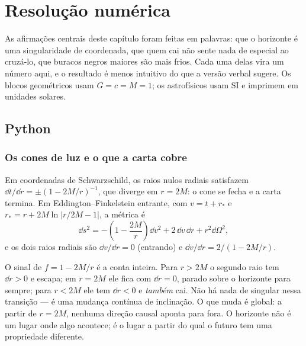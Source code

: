 \section{Resolução numérica}
\label{sec:cap11-numerica}

As afirmações centrais deste capítulo foram feitas em palavras: que o
horizonte é uma singularidade de coordenada, que quem cai não sente nada de
especial ao cruzá-lo, que buracos negros maiores são mais frios. Cada uma
delas vira um número aqui, e o resultado é menos intuitivo do que a versão
verbal sugere. Os blocos geométricos usam $G=c=M=1$; os astrofísicos usam SI
e imprimem em unidades solares.

\subsection{Python}


\subsubsection*{Os cones de luz e o que a carta cobre}

Em coordenadas de Schwarzschild, os raios nulos radiais satisfazem
$\dd t/\dd r = \pm(1-2M/r)^{-1}$, que diverge em $r=2M$: o cone se fecha e a
carta termina. Em Eddington--Finkelstein entrante, com $v = t+r_{*}$ e
$r_{*} = r + 2M\ln|r/2M - 1|$, a métrica é
\begin{equation}
  \dd s^{2} = -\left(1-\frac{2M}{r}\right)\dd v^{2}
              + 2\,\dd v\,\dd r + r^{2}\dd\Omega^{2},
  \label{eq:cap12-ef}
\end{equation}
e os dois raios radiais são $\dd v/\dd r = 0$ (entrando) e
$\dd v/\dd r = 2/(1-2M/r)$.

\begin{atencao}
O sinal de $f = 1-2M/r$ é a conta inteira. Para $r>2M$ o segundo raio tem
$\dd r>0$ e escapa; em $r=2M$ ele fica com $\dd r=0$, parado sobre o
horizonte para sempre; para $r<2M$ ele tem $\dd r<0$ e \emph{também} cai. Não
há nada de singular nessa transição --- é uma mudança contínua de inclinação.
O que muda é global: a partir de $r=2M$, nenhuma direção causal aponta para
fora. O horizonte não é um lugar onde algo acontece; é o lugar a partir do
qual o futuro tem uma propriedade diferente.
\end{atencao}

